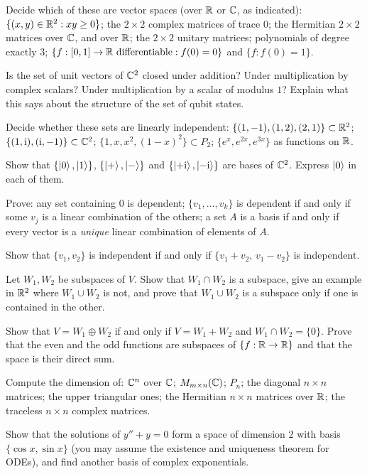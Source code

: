 \begin{exerciseset}
   Decide which of these are vector spaces (over $\mathbb{R}$ or $\mathbb{C}$, as indicated): $\{(x,y)\in\mathbb{R}^2:xy\ge0\}$; the $2\times2$ complex matrices of trace $0$; the Hermitian $2\times2$ matrices over $\mathbb{C}$, and over $\mathbb{R}$; the $2\times2$ unitary matrices; polynomials of degree exactly $3$; $\{f:[0,1]\to\mathbb{R}\text{ differentiable}: f(0)=0\}$ and $\{f:f(0)=1\}$.

   Is the set of unit vectors of $\mathbb{C}^2$ closed under addition? Under multiplication by complex scalars? Under multiplication by a scalar of modulus $1$? Explain what this says about the structure of the set of qubit states.

   Decide whether these sets are linearly independent: $\{(1,-1),(1,2),(2,1)\}\subset\mathbb{R}^2$; $\{(1,\mathrm{i}),(\mathrm{i},-1)\}\subset\mathbb{C}^2$; $\{1,x,x^2,(1-x)^2\}\subset P_2$; $\{e^x,e^{2x},e^{3x}\}$ as functions on $\mathbb{R}$.

   Show that $\{\left|0\right\rangle,\left|1\right\rangle\}$, $\{\left|+\right\rangle,\left|-\right\rangle\}$ and $\{\left|+\mathrm{i}\right\rangle,\left|-\mathrm{i}\right\rangle\}$ are bases of $\mathbb{C}^2$. Express $\left|0\right\rangle$ in each of them.

   Prove: any set containing $0$ is dependent; $\{v_1,\dots,v_k\}$ is dependent if and only if some $v_j$ is a linear combination of the others; a set $A$ is a basis if and only if every vector is a \emph{unique} linear combination of elements of $A$.

   Show that $\{v_1,v_2\}$ is independent if and only if $\{v_1+v_2,\,v_1-v_2\}$ is independent.

   Let $W_1,W_2$ be subspaces of $V$. Show that $W_1\cap W_2$ is a subspace, give an example in $\mathbb{R}^2$ where $W_1\cup W_2$ is not, and prove that $W_1\cup W_2$ is a subspace only if one is contained in the other.

   Show that $V=W_1\oplus W_2$ if and only if $V=W_1+W_2$ and $W_1\cap W_2=\{0\}$. Prove that the even and the odd functions are subspaces of $\{f:\mathbb{R}\to\mathbb{R}\}$ and that the space is their direct sum.

   Compute the dimension of: $\mathbb{C}^n$ over $\mathbb{C}$; $M_{m\times n}(\mathbb{C})$; $P_n$; the diagonal $n\times n$ matrices; the upper triangular ones; the Hermitian $n\times n$ matrices over $\mathbb{R}$; the traceless $n\times n$ complex matrices.

   Show that the solutions of $y''+y=0$ form a space of dimension $2$ with basis $\{\cos x,\sin x\}$ (you may assume the existence and uniqueness theorem for ODEs), and find another basis of complex exponentials.


\end{exerciseset}

